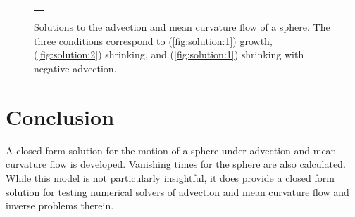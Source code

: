 \documentclass[journal]{IEEEtran}
\begin{document}
\begin{figure}[t]
\begin{tabular}{c}
{      \label{fig:solution:3}
    }
  \end{tabular}
  \caption{Solutions to the advection and mean curvature flow of a sphere. The three conditions correspond to (\ref{fig:solution:1}) growth, (\ref{fig:solution:2}) shrinking, and (\ref{fig:solution:1}) shrinking with negative advection.}
  \label{fig:solution}
\end{figure}

\section{Conclusion}
A closed form solution for the motion of a sphere under advection and mean curvature flow is developed.
Vanishing times for the sphere are also calculated.
While this model is not particularly insightful, it does provide a closed form solution for testing numerical solvers of advection and mean curvature flow and inverse problems therein.


%




\appendices
\end{document}
